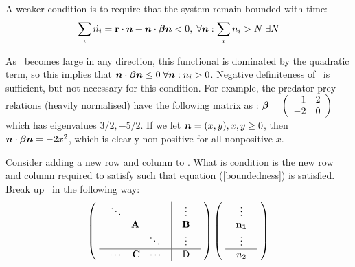 A weaker condition is to require that the system remain bounded with
time:
\begin{equation}\label{boundedness}
\sum_i\dot{n_i}=\mbox{${\bf r}$}\cdot\mbox{\boldmath{$n$}} + \mbox{\boldmath{$n$}}\cdot\mbox{\boldmath{$\beta$}}\mbox{\boldmath{$n$}} < 0, \;\forall \mbox{\boldmath{$n$}}:
\sum_in_i>N \;\exists N
\end{equation}

As \bn\ becomes large in any direction, this functional is dominated
by the quadratic term, so this implies that  $\mbox{\boldmath{$n$}}\cdot\mbox{\boldmath{$\beta$}}\mbox{\boldmath{$n$}}\leq0
\; \forall\mbox{\boldmath{$n$}}: n_i>0$. Negative definiteness of \bbeta\ is sufficient,
but not necessary for this condition. For example, the predator-prey
relations (heavily normalised) have the following matrix as \bbeta:
\begin{math}
\mbox{\boldmath{$\beta$}}=\left(\begin{array}{cc}
-1 & 2\\
-2 & 0\\
\end{array}\right)
\end{math}
which has eigenvalues $3/2, -5/2$. If we let $\mbox{\boldmath{$n$}}=(x,y), x,y\geq0$, then
$\mbox{\boldmath{$n$}}\cdot\mbox{\boldmath{$\beta$}}\mbox{\boldmath{$n$}}=-2x^2$, which is clearly non-positive
for all nonpositive $x$.

Consider adding a new row and column to \bbeta. What is condition is
the new row and column required to satisfy such that equation
(\ref{boundedness}) is satisfied. Break up \bbeta\ in the following
way:
\begin{displaymath}
\left(
  \mbox{
     \begin{tabular}{c|c}
       $\begin{array}{ccc}\ddots\\&{\bf A}\\&&\ddots\end{array}$ & 
       $\begin{array}{c}\vdots\\{\bf B}\\\vdots\end{array}$ \\
       \hline
       $\begin{array}{ccc}\cdots&{\bf C}&\cdots\end{array}$ & D
     \end{tabular}
   }
\right)
\left(
  \mbox{
     \begin{tabular}{c}
     $\begin{array}{c}\vdots\\{\bf n_1}\\\vdots\end{array}$\\
     \hline
     $n_2$
     \end{tabular}
    }
\right)
\end{displaymath}

